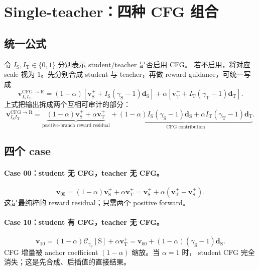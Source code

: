 \documentclass[11pt,a4paper]{article}
\newcommand{\C}{\mathcal{C}}
\newcommand{\vfield}{\bm{v}}
\newcommand{\student}{\mathrm{S}}
\newcommand{\teacher}{\mathrm{T}}
\newcommand{\pos}{+}
\theoremstyle{definition}
\theoremstyle{plain}
\begin{document}
\section{Single-teacher：四种 CFG 组合}

\subsection{统一公式}

令 $I_\student,I_\teacher\in\{0,1\}$ 分别表示 student/teacher 是否启用 CFG。
若不启用，将对应 scale 视为 $1$。先分别合成 student 与 teacher，再做 reward
guidance，可统一写成
\begin{equation}
\boxed{
  \vfield_{I_\student I_\teacher}^{\mathrm{CFG}\to\mathrm{R}}
  =
  (1-\alpha)
  \left[
    \vfield_\student^\pos
    +I_\student(\gamma_\student-1)\bm d_\student
  \right]
  +
  \alpha
  \left[
    \vfield_\teacher^\pos
    +I_\teacher(\gamma_\teacher-1)\bm d_\teacher
  \right].
}
\label{eq:four-unified}
\end{equation}
上式把输出拆成两个互相可审计的部分：
\begin{equation}
  \vfield_{I_\student I_\teacher}^{\mathrm{CFG}\to\mathrm{R}}
  =
  \underbrace{
    (1-\alpha)\vfield_\student^\pos+\alpha\vfield_\teacher^\pos
  }_{\text{positive-branch reward residual}}
  +
  \underbrace{
    (1-\alpha)I_\student(\gamma_\student-1)\bm d_\student
    +\alpha I_\teacher(\gamma_\teacher-1)\bm d_\teacher
  }_{\text{CFG contribution}}.
  \label{eq:four-decomposition}
\end{equation}

\subsection{四个 case}

\paragraph{Case 00：student 无 CFG，teacher 无 CFG。}
\begin{equation}
  \vfield_{00}
  =
  (1-\alpha)\vfield_\student^\pos+\alpha\vfield_\teacher^\pos
  =
  \vfield_\student^\pos
  +\alpha(\vfield_\teacher^\pos-\vfield_\student^\pos).
  \label{eq:case-00}
\end{equation}
这是最纯粹的 reward residual；只需两个 positive forward。

\paragraph{Case 10：student 有 CFG，teacher 无 CFG。}
\begin{equation}
  \vfield_{10}
  =
  (1-\alpha)\C_{\gamma_\student}[\student]
  +\alpha\vfield_\teacher^\pos
  =
  \vfield_{00}
  +(1-\alpha)(\gamma_\student-1)\bm d_\student.
  \label{eq:case-10}
\end{equation}
CFG 增量被 anchor coefficient $(1-\alpha)$ 缩放。当 $\alpha=1$ 时，
student CFG 完全消失；这是先合成、后插值的直接结果。
\end{document}
